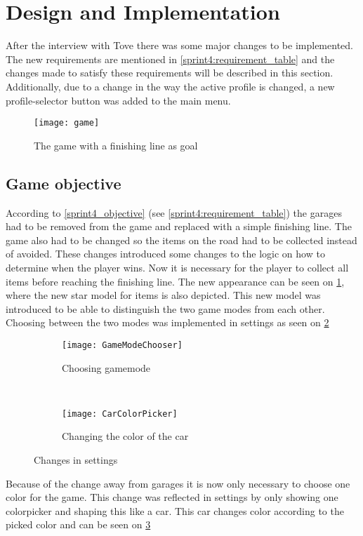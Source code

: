 \section{Design and Implementation}
After the interview with Tove there was some major changes to be implemented.
The new requirements are mentioned in \cref{sprint4:requirement_table} and the changes made to satisfy these requirements will be described in this section.
Additionally, due to a change in the way the active profile is changed, a new profile-selector button was added to the main menu.

\begin{figure}
\texttt{[image: game]}
\caption{The game with a finishing line as goal}
\label{game_with_finishing_line}
\end{figure}

\subsection{Game objective}\label{s4_gameobjective}
According to \cref{sprint4_objective} (see \cref{sprint4:requirement_table}) the garages had to be removed from the game and replaced with a simple finishing line.
The game also had to be changed so the items on the road had to be collected instead of avoided.
These changes introduced some changes to the logic on how to determine when the player wins.
Now it is necessary for the player to collect all items before reaching the finishing line. 
The new appearance can be seen on \cref{game_with_finishing_line}, where the new star model for items is also depicted.
This new model was introduced to be able to distinguish the two game modes from each other.
Choosing between the two modes was implemented in settings as seen on \cref{gamemode}


\begin{figure}
\begin{subfigure}{0.5\textwidth}
\centering
\texttt{[image: GameModeChooser]}
\caption{Choosing gamemode}
\label{gamemode}
\end{subfigure}
~
\begin{subfigure}{0.5\textwidth}
\centering
\texttt{[image: CarColorPicker]}
\caption{Changing the color of the car}
\label{carcolor}
\end{subfigure}
\caption{Changes in settings}
\label{Settings}
\end{figure}

Because of the change away from garages it is now only necessary to choose one color for the game. 
This change was reflected in settings by only showing one colorpicker and shaping this like a car.
This car changes color according to the picked color and can be seen on \cref{carcolor}

